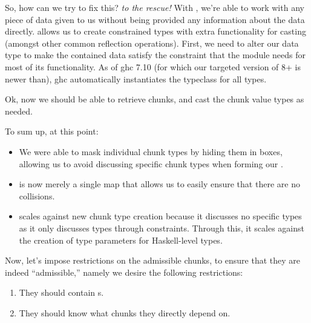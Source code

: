 \chunkRetrieverError{}

So, how can we try to fix this?  \textit{to the rescue!}
With , we're able to work with any piece of data given
to us without being provided any information about the data directly.
 allows us to create constrained types with extra
functionality for casting (amongst other common reflection operations). First,
we need to alter our \Chunk{} data type to make the contained data satisfy the
\Typeable{} constraint that the \Typeable{} module needs for most of its
functionality. As of \acs{ghc} 7.10 (for which our targeted version of 8+ is
newer than), \acs{ghc} automatically instantiates the \Typeable{} typeclass for
all types.

\examinableChunkBox{}

Ok, now we should be able to retrieve chunks, and cast the chunk value types as
needed.

\workingChunkRetriever{}

To sum up, at this point:

\begin{itemize}

      \item We were able to mask individual chunk types by hiding them in
            \Chunk{} boxes, allowing us to avoid discussing specific chunk types
            when forming our \ChunkDB{}.

      \item \ChunkDB{} is now merely a single map that allows us to easily
            ensure that there are no \UID{} collisions.

      \item \ChunkDB{} scales against new chunk type creation because it
            discusses no specific types as it only discusses types through
            constraints. Through this, it scales against the creation of type
            parameters for Haskell-level types.

\end{itemize}

Now, let's impose restrictions on the admissible chunks, to ensure that they are
indeed ``admissible,'' namely we desire the following restrictions:

\begin{enumerate}
      
      \item They should contain \UID{}s.
      
      \item They should know what chunks they directly depend on.

\end{enumerate}

